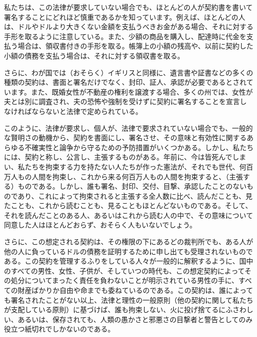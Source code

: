 \documentclass[dvipdfmx, uplatex, tate, landscape]{utbook}
\begin{document}
私たちは、この法律が要求していない場合でも、ほとんどの人が契約書を書いて署名することにどれほど慎重であるかを知っています。例えば、ほとんどの人は、ドルやドルより大きくない金額を支払うべきお金がある場合、それに対する手形を取るように注意している。また、少額の商品を購入し、配達時に代金を支払う場合は、領収書付きの手形を取る。帳簿上の小額の残高や、以前に契約した小額の債務を支払う場合は、それに対する領収書を取る。

さらに、わが国では（おそらく）イギリスと同様に、遺言書や証書などの多くの種類の契約は、書面と署名だけでなく、封印、証人、承認が必要であるとされています。また、既婚女性が不動産の権利を譲渡する場合、多くの州では、女性が夫とは別に調査され、夫の恐怖や強制を受けずに契約に署名することを宣言しなければならないと法律で定められている。

このように、法律が要求し、個人が、法律で要求されていない場合でも、一般的な賢明さの動機から、契約を書面にし、署名させ、その意味と有効性に関するあらゆる不確実性と論争から守るための予防措置がいくつかある。しかし、私たちには、契約と称し、公言し、主張するものがある。年前に、今は皆死んでしまい、私たちを拘束する力を持たない人たちが作った憲法が、それでも世代、何百万人もの人間を拘束し、これから来る何百万人もの人間を拘束すると、（主張する）ものである。しかし、誰も署名、封印、交付、目撃、承認したことのないものであり、これによって拘束されると主張する全人数に比べ、読んだことも、見たことも、これから読むことも、見ることもほとんどないものである。そして、それを読んだことのある人、あるいはこれから読む人の中で、その意味について同意した人はほとんどおらず、おそらく人もいないでしょう。

さらに、この想定される契約は、その権限の下にあるどの裁判所でも、ある人が他の人に負っているドルの債務を証明するために申し出ても受理されないものである。この契約を管理するふりをしている人々が一般的に解釈するように、国中のすべての男性、女性、子供が、そしていつの時代も、この想定契約によってその処分についてまったく責任を負わないことが明示されている男性の手に、すべての財産ばかりか自由や命までも委ねているのである。この契約は、誰によっても署名されたことがない以上、法律と理性の一般原則（他の契約に関して私たちが支配している原則）に基づけば、誰も拘束しない、火に投げ捨てるにふさわしい、あるいは、保存されても、人類の愚かさと邪悪さの目撃者と警告としてのみ役立つ紙切れでしかないのである。

\chapter{}
\end{document}
